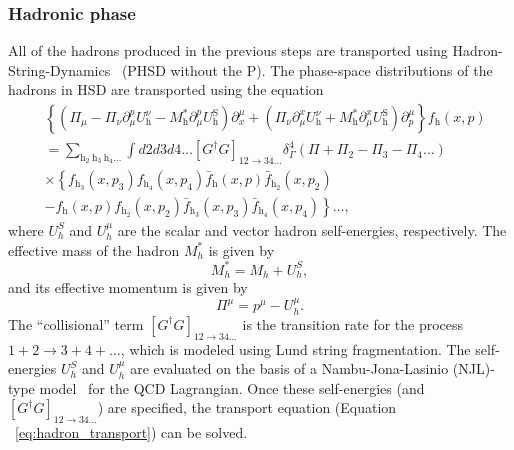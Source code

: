 \subsubsection{Hadronic phase}
All of the hadrons produced in the previous steps are transported using Hadron-String-Dynamics~\cite{HSD} (PHSD without the P). The phase-space distributions of the hadrons in HSD are transported using the equation
\begin{equation}
\label{eq:hadron_transport}
\begin{aligned}
& \left\{\left(\Pi_\mu-\Pi_\nu \partial_\mu^p U_{\mathrm{h}}^\nu-M_{\mathrm{h}}^* \partial_\mu^p U_{\mathrm{h}}^{\mathrm{S}}\right) \partial_x^\mu+\left(\Pi_\nu \partial_\mu^x U_{\mathrm{h}}^\nu+M_{\mathrm{h}}^* \partial_\mu^x U_{\mathrm{h}}^{\mathrm{S}}\right) \partial_p^\mu\right\} f_{\mathrm{h}}(x, p) \\
& =\sum_{\mathrm{h}_2 \mathrm{~h}_3 \mathrm{~h}_4 \ldots} \int d 2 d 3 d 4 \ldots\left[G^{\dagger} G\right]_{12 \rightarrow 34 \ldots} \delta_{\Gamma}^4\left(\Pi+\Pi_2-\Pi_3-\Pi_4 \ldots\right) \\
& \times\left\{f_{\mathrm{h}_3}\left(x, p_3\right) f_{\mathrm{h}_4}\left(x, p_4\right) \bar{f}_{\mathrm{h}}(x, p) \bar{f}_{\mathrm{h}_2}\left(x, p_2\right)\right. \\
& \left.-f_{\mathrm{h}}(x, p) f_{\mathrm{h}_2}\left(x, p_2\right) \bar{f}_{\mathrm{h}_3}\left(x, p_3\right) \bar{f}_{\mathrm{h}_4}\left(x, p_4\right)\right\} \ldots,
\end{aligned}
\end{equation}
where $U_h^S$ and $U_h^\mu$ are the scalar and vector hadron self-energies, respectively. The effective mass of the hadron $M_h^*$ is given by
\begin{equation}
    M_h^* = M_h + U_h^S,
\end{equation}
and its effective momentum is given by
\begin{equation}
    \Pi^\mu = p^\mu - U_h^\mu.
\end{equation}
The ``collisional'' term $\left[G^\dagger G\right]_{12 \rightarrow 34 \ldots}$ is the transition rate for the process $1 + 2 \rightarrow 3 + 4 + \ldots$, which is modeled using Lund string fragmentation. The self-energies $U_h^S$ and $U_h^\mu$ are evaluated on the basis of a Nambu-Jona-Lasinio (NJL)-type model~\cite{NJL} for the QCD Lagrangian. Once these self-energies (and $\left[G^\dagger G\right]_{12 \rightarrow 34 \ldots}$) are specified, the transport equation (Equation ~\ref{eq:hadron_transport}) can be solved.

